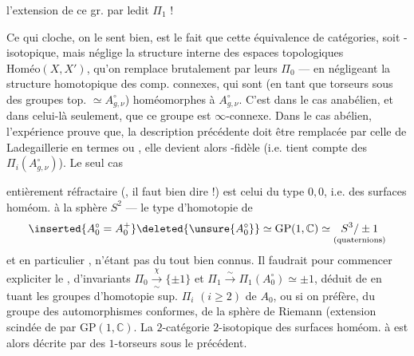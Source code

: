 l'extension de ce gr. par ledit $\Pi_1$ !

Ce qui cloche, on le sent bien, est
le fait que cette équivalence de catégories,
soit -isotopique, mais néglige la
structure  interne des espaces topologiques
 $\mathrm{Homéo}(X,X')$, qu'on remplace
brutalement par leurs $\Pi_0$ --- en négligeant
la structure homotopique des comp.
connexes, qui sont (en tant que torseurs
sous des groupes top. $\simeq A_{g,\nu}^{\circ}$) homéomorphes
à $A_{g,\nu}^{\circ}$. C'est  dans le cas
anabélien, et dans celui-là seulement,
que ce groupe est $\infty$-connexe. Dans
le cas abélien, l'expérience prouve que,
la description précédente doit être remplacée
par celle de Ladegaillerie en termes 
 ou ,  elle
devient alors  \unsure{$\infty$}-fidèle (i.e. tient compte
des $\Pi_i(A_{g,\nu}^{\circ})$). Le seul cas

entièrement réfractaire (, il
faut bien dire !) est celui du type $0,0$, i.e.
des surfaces homéom. à la sphère $S^2$
--- le type d'homotopie de 
\[
\inserted{A_0^\circ=A_0^+}\deleted{\unsure{A_0^\circ}}
\simeq \mathrm{GP}(1,\mathbb C)\simeq
\underset{(\text{quaternions})}{S^3/\pm1}
\]
et en particulier  , n'étant pas du
tout bien connus. Il faudrait pour
commencer  expliciter le
 , d'invariants $\Pi_0\xrightarrow[\sim]{\chi}\{\pm1\}$ et
$\Pi_1\xrightarrow{\sim}\Pi_1(A_0^\circ)\simeq\pm1$, déduit de 
en tuant les groupes d'homotopie sup.
$\Pi_i$ $(i\geq2)$ de $A_0$, ou si on préfère,
du groupe des automorphismes conformes,
de la sphère de Riemann (extension
scindée de  par $\mathrm{GP}(1,\mathbb C)$.
La $2$-catégorie
$2$-isotopique des surfaces homéom. à 
 est alors décrite par  des
$1$-torseurs sous le  précédent.

